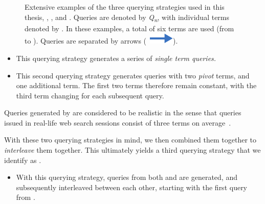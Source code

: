 \begin{figure}[t!]
    \centering
    \caption[Querying strategies ,  and ]{Extensive examples of the three querying strategies used in this thesis, , , and . Queries are denoted by \emph{Q\textsubscript{n}}, with individual terms denoted by . In these examples, a total of six terms are used (from  to ). Queries are separated by arrows (~\includegraphics[height=\fontcharht\font`\d]{figures/src/arrow-blue-right.pdf}).}
    \label{fig:querying}
\end{figure}

\begin{itemize}
    \item{ This querying strategy generates a series of \emph{single term queries.}}
    \item{ This second querying strategy generates queries with two \emph{pivot} terms, and one additional term. The first two terms therefore remain constant, with the third term changing for each subsequent query.}
\end{itemize}

Queries generated by  are considered to be realistic in the sense that queries issued in real-life web search sessions consist of three terms on average~\citep{keskustalo2009querying}.

With these two querying strategies in mind, we then combined them together to \emph{interleave} them together. This ultimately yields a third querying strategy that we identify as .

\begin{itemize}
    \item{ With this querying strategy, queries from both  and  are generated, and subsequently interleaved between each other, starting with the first query from .}
\end{itemize}

